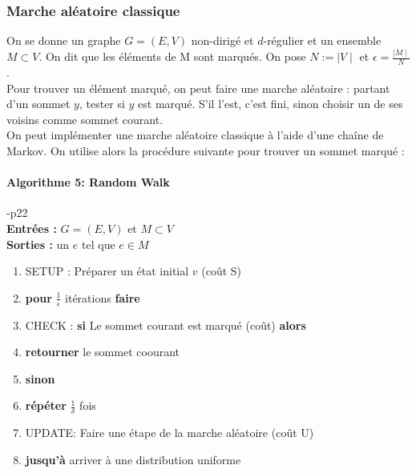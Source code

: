 \documentclass[12pt,openany]{report}
\begin{document}
\subsubsection{Marche aléatoire classique}
On se donne un graphe $\mathit{G} = (E, V)$ non-dirigé et $d$-régulier et un ensemble $M \subset V $. On dit que les éléments de M sont marqués. On pose $N := \mid V \mid $ et
$ \epsilon=\frac{\mid M \mid}{N} $.\\
Pour trouver un élément marqué, on peut faire une marche aléatoire : partant d’un sommet $y$, tester si $y$ est marqué. S’il l’est, c’est fini, sinon choisir un de
ses voisins comme sommet courant.\\
On peut implémenter une marche aléatoire classique à l’aide d’une chaîne de Markov. On utilise alors la procédure suivante pour trouver un sommet marqué :\\

\begin{boxedminipage}[ poslb ]{15cm}
\paragraph{Algorithme 5: Random Walk }\cite{Ghazal}-p22 \\
\hspace{0.3cm} \textbf{Entrées :} $\mathit{G }= (E,V )$ et $M \subset V $\\
\hspace{0.3cm} \textbf{Sorties :} un $e$ tel que $ e \in M $\\
\begin{enumerate}
\item SETUP : Préparer un état initial $v$ (coût S)
\item \textbf{pour} $\frac{1}{\epsilon}$ itérations \textbf{faire}
\item \hspace{0.3cm} CHECK : \textbf{si} Le sommet courant est marqué (coût) \textbf{alors}
\item \hspace{1cm} \textbf{retourner} le sommet coourant
\item \hspace{0.3cm} \textbf{sinon}
\item \hspace{1cm} \textbf{répéter} $\frac{1}{\delta}$ fois
\item \hspace{1.5cm} UPDATE: Faire une étape de la marche aléatoire (coût U)
\item \hspace{1cm} \textbf{jusqu'à} arriver à une distribution uniforme

\end{enumerate}


\end{boxedminipage}
\end{document}
